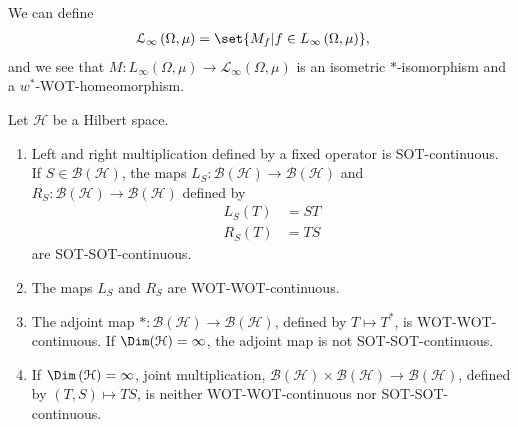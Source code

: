 \documentclass[10pt]{mypackage}
\begin{document}
\begin{example}
  We can define
  \begin{align*}
    \mathcal{L}_{\infty}\left(\Omega,\mu\right) &= \set{M_{f} | f\in L_{\infty}\left(\Omega,\mu\right)},
  \end{align*}
  and we see that $M: L_{\infty}\left(\Omega,\mu\right) \rightarrow \mathcal{L}_{\infty}\left(\Omega,\mu\right)$ is an isometric $\ast$-isomorphism and a $w^{\ast}$-WOT-homeomorphism.
\end{example}
\begin{proposition}
  Let $\mathcal{H}$ be a Hilbert space.
  \begin{enumerate}[(1)]
    \item Left and right multiplication defined by a fixed operator is SOT-continuous. If $S\in \mathcal{B}\left(\mathcal{H}\right)$, the maps $L_{S}\colon \mathcal{B}\left(\mathcal{H}\right)\rightarrow \mathcal{B}\left(\mathcal{H}\right)$ and $R_{S}\colon \mathcal{B}\left(\mathcal{H}\right)\rightarrow \mathcal{B}\left(\mathcal{H}\right)$ defined by
      \begin{align*}
        L_S\left(T\right) &= ST\\
        R_{S}\left(T\right) &= TS
      \end{align*}
      are SOT-SOT-continuous.
    \item The maps $L_S$ and $R_S$ are WOT-WOT-continuous.
    \item The adjoint map $\ast\colon \mathcal{B}\left(\mathcal{H}\right)\rightarrow \mathcal{B}\left(\mathcal{H}\right)$, defined by $T\mapsto T^{\ast}$, is WOT-WOT-continuous. If $\Dim(\mathcal{H}) = \infty$, the adjoint map is not SOT-SOT-continuous.
    \item If $\Dim\left(\mathcal{H}\right) = \infty$, joint multiplication, $\mathcal{B}\left(\mathcal{H}\right)\times \mathcal{B}\left(\mathcal{H}\right)\rightarrow \mathcal{B}\left(\mathcal{H}\right)$, defined by $\left(T,S\right)\mapsto TS$, is neither WOT-WOT-continuous nor SOT-SOT-continuous.
  \end{enumerate}
\end{proposition}
\end{document}

